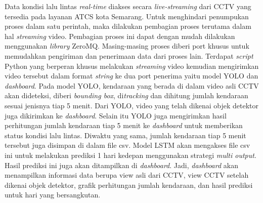 \documentclass[../thesis.tex]{subfiles}
\begin{document}
Data kondisi lalu lintas \textit{real-time} diakses secara \textit{live-streaming} dari CCTV yang tersedia pada layanan ATCS kota Semarang. Untuk menghindari penumpukan proses dalam satu perintah, maka dilakukan pembagian proses terutama dalam hal \textit{streaming} video.
Pembagian proses ini dapat dengan mudah dilakukan menggunakan \textit{library} ZeroMQ. Masing-masing proses diberi port khusus untuk memudahkan pengiriman dan penerimaan data dari proses lain.
Terdapat \textit{script} Python yang berperan khusus melakukan \textit{streaming} video kemudian mengirimkan video tersebut dalam format \textit{string} ke dua port penerima yaitu model YOLO dan \textit{dashboard}. Pada model YOLO, kendaraan yang berada di dalam video asli CCTV akan dideteksi, diberi \textit{bounding box}, di\textit{tracking} dan dihitung jumlah kendaraan sesuai jenisnya tiap 5 menit.
Dari YOLO, video yang telah dikenai objek detektor juga dikirimkan ke \textit{dashboard}. Selain itu YOLO juga mengirimkan hasil perhitungan jumlah kendaraan tiap 5 menit ke \textit{dashboard} untuk memberikan status kondisi lalu lintas. Diwaktu yang sama, jumlah kendaraan tiap 5 menit tersebut juga disimpan di dalam file csv. 
Model LSTM akan mengakses file csv ini untuk melakukan prediksi 1 hari kedepan menggunakan strategi \textit{multi output}. Hasil prediksi ini juga akan ditampilkan di \textit{dashboard}.
Jadi, \textit{dashboard} akan menampilkan informasi data berupa view asli dari CCTV, view CCTV setelah dikenai objek detektor, grafik perhitungan jumlah kendaraan, dan hasil prediksi untuk hari yang bersangkutan.
\end{document}
